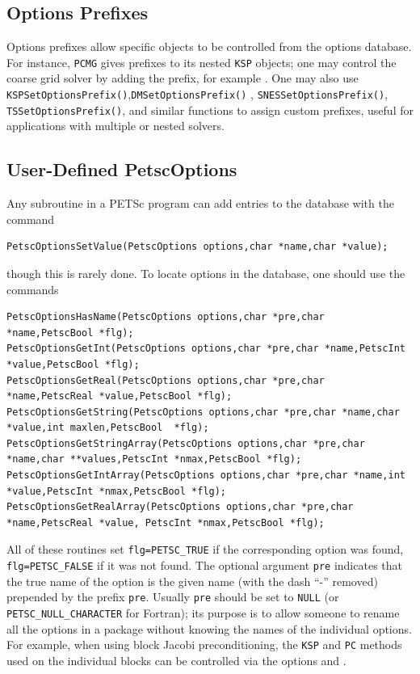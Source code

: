 {{{\subsection{Options Prefixes}
Options prefixes allow specific objects to be controlled from the options database.
For instance, \lstinline{PCMG} gives prefixes to its nested \lstinline{KSP} objects;
one may control the coarse grid solver by adding the  prefix, for example
.
One may also use \break \lstinline{KSPSetOptionsPrefix()},\lstinline{DMSetOptionsPrefix()}
, \lstinline{SNESSetOptionsPrefix()}, \lstinline{TSSetOptionsPrefix()}, and similar
functions to assign custom prefixes, useful for applications with multiple or nested
solvers.

\subsection{User-Defined PetscOptions}

Any subroutine in a PETSc program can add entries to the database with the
command
\begin{lstlisting}
PetscOptionsSetValue(PetscOptions options,char *name,char *value);
\end{lstlisting}
though this is rarely done.
To locate options in the database, one should use the
commands
\begin{lstlisting}
PetscOptionsHasName(PetscOptions options,char *pre,char *name,PetscBool *flg);
PetscOptionsGetInt(PetscOptions options,char *pre,char *name,PetscInt *value,PetscBool *flg);
PetscOptionsGetReal(PetscOptions options,char *pre,char *name,PetscReal *value,PetscBool *flg);
PetscOptionsGetString(PetscOptions options,char *pre,char *name,char *value,int maxlen,PetscBool  *flg);
PetscOptionsGetStringArray(PetscOptions options,char *pre,char *name,char **values,PetscInt *nmax,PetscBool *flg);
PetscOptionsGetIntArray(PetscOptions options,char *pre,char *name,int *value,PetscInt *nmax,PetscBool *flg);
PetscOptionsGetRealArray(PetscOptions options,char *pre,char *name,PetscReal *value, PetscInt *nmax,PetscBool *flg);
\end{lstlisting}
All of
these
routines set \lstinline{flg=PETSC_TRUE} if the corresponding option was found, \lstinline{flg=PETSC_FALSE} if it
was not found.  The optional argument
\lstinline{pre} indicates that the true name of the option is the given name
(with the dash ``-'' removed) prepended by the prefix \lstinline{pre}.
Usually \lstinline{pre} should be set to \lstinline{NULL} (or \lstinline{PETSC_NULL_CHARACTER}
for Fortran); its purpose is to
allow someone to rename all the options in a package without knowing
the names of the individual options.  For example, when using block
Jacobi preconditioning, the \lstinline{KSP} and \lstinline{PC} methods used on the individual
blocks can be controlled via the options  and 
. 

}}}
